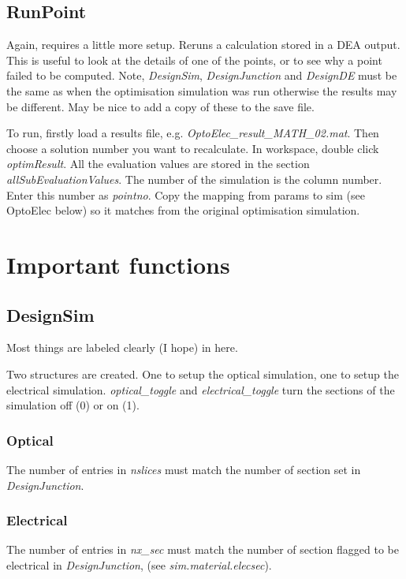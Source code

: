 \documentclass[]{article}  %
\begin{document}
	\subsection{RunPoint}

	Again, requires a little more setup. Reruns a calculation stored in a DEA output. This is useful to look at the details of one of the points, or to see why a point failed to be computed. Note, \emph{DesignSim}, \emph{DesignJunction} and \emph{DesignDE} must be the same as when the optimisation simulation was run otherwise the results may be different. May be nice to add a copy of these to the save file.
	
	To run, firstly load a results file, e.g. \emph{OptoElec\_result\_MATH\_02.mat}. Then choose a solution number you want to recalculate. In workspace, double click \emph{optimResult}. All the evaluation values are stored in the section \emph{allSubEvaluationValues}. The number of the simulation is the column number. Enter this number as \emph{pointno}. Copy the mapping from params to sim (see OptoElec below) so it matches from the original optimisation simulation.
	

\section{Important functions}

\subsection{DesignSim}
Most things are labeled clearly (I hope) in here.

Two structures are created. One to setup the optical simulation, one to setup the electrical simulation. \emph{optical\_toggle} and \emph{electrical\_toggle} turn the sections of the simulation off (0) or on (1). 
\subsubsection{Optical}
The number of entries in \emph{nslices} must match the number of section set in \emph{DesignJunction}. 

\subsubsection{Electrical}
The number of entries in \emph{nx\_sec} must match the number of section flagged to be electrical in \emph{DesignJunction}, (see \emph{sim.material.elecsec}).
\end{document}
